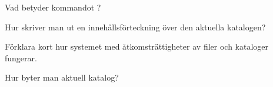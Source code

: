 \item Vad betyder kommandot ?
\qskip
\item Hur skriver man ut en innehållsförteckning över den aktuella katalogen?
\qskip
\item Förklara kort hur systemet med åtkomsträttigheter av filer och kataloger fungerar.
\qskip
\item Hur byter man aktuell katalog?
